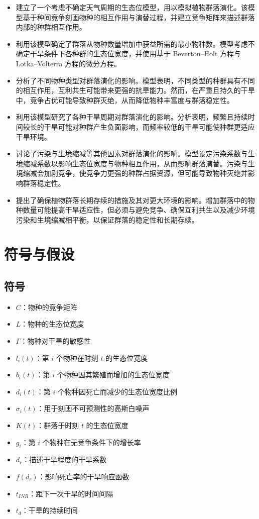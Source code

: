 \documentclass[11pt,a4paper]{ctexart}
\begin{document}
\begin{itemize}
\item 建立了一个考虑不确定天气周期的生态位模型，用以模拟植物群落演化。该模型基于种间竞争刻画物种的相互作用与演替过程，并建立竞争矩阵来描述群落内部的种群相互作用。
\item 利用该模型确定了群落从物种数量增加中获益所需的最小物种数。模型考虑不确定干旱条件下各种群的生态位宽度，并使用基于 Beverton--Holt 方程与 Lotka--Volterra 方程的微分方程。
\item 分析了不同物种类型对群落演化的影响。模型表明，不同类型的种群具有不同的相互作用，互利共生可能带来更强的抗旱能力。然而，在严重且持久的干旱中，竞争占优可能导致种群灭绝，从而降低物种丰富度与群落稳定性。
\item 利用该模型研究了各种干旱周期对群落演化的影响。分析表明，频繁且持续时间较长的干旱可能对种群产生负面影响，而频率较低的干旱可能使种群更适应干旱环境。
\item 讨论了污染与生境缩减等其他因素对群落演化的影响。模型设定污染系数与生境缩减系数以影响生态位宽度与物种相互作用，从而影响群落演替。污染与生境缩减会加剧竞争，使竞争力更强的种群占据资源，但可能导致物种灭绝并影响群落稳定性。
\item 提出了确保植物群落长期存续的措施及其对更大环境的影响。增加群落中的物种数量可能提高干旱适应性，但必须与避免竞争、确保互利共生以及减少环境污染和生境缩减相平衡，以保证群落的稳定性和长期存续。
\end{itemize}

\section{符号与假设}

\subsection{符号}

\begin{itemize}
\item $C$：物种的竞争矩阵
\item $L$：物种的生态位宽度
\item $\Gamma$：物种对干旱的敏感性
\item $l_i(t)$：第 $i$ 个物种在时刻 $t$ 的生态位宽度
\item $b_i(t)$：第 $i$ 个物种因其繁殖而增加的生态位宽度
\item $d_i(t)$：第 $i$ 个物种因死亡而减少的生态位宽度比例
\item $\sigma_i(t)$：用于刻画不可预测性的高斯白噪声
\item $K(t)$：群落于时刻 $t$ 的生态位宽度
\item $g_i$：第 $i$ 个物种在无竞争条件下的增长率
\item $d_r$：描述干旱程度的干旱系数
\item $f(d_r)$：影响死亡率的干旱响应函数
\item $t_{INR}$：距下一次干旱的时间间隔
\item $t_d$：干旱的持续时间
\end{itemize}
\end{document}
